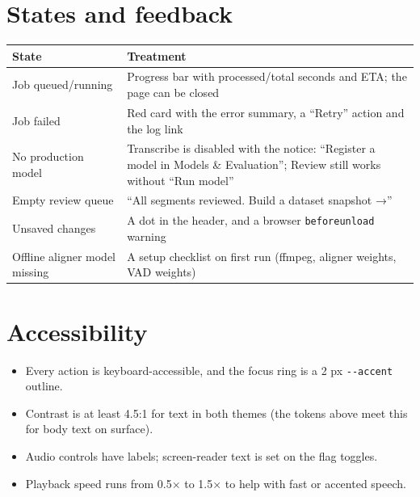 \documentclass[11pt]{article}
\begin{document}
\hypertarget{states-and-feedback}{%
\section{States and feedback}\label{states-and-feedback}}

\begin{longtable}[]{@{}>{\raggedright\arraybackslash}p{}>{\raggedright\arraybackslash}p{}@{}}
\toprule\noalign{}
State & Treatment \\
\midrule\noalign{}
\endhead
\bottomrule\noalign{}
\endlastfoot
Job queued/running & Progress bar with processed/total seconds and ETA; the page can be closed \\
Job failed & Red card with the error summary, a ``Retry'' action and the log link \\
No production model & Transcribe is disabled with the notice: ``Register a model in Models \& Evaluation''; Review still works without ``Run model'' \\
Empty review queue & ``All segments reviewed. Build a dataset snapshot →'' \\
Unsaved changes & A dot in the header, and a browser \texttt{beforeunload} warning \\
Offline aligner model missing & A setup checklist on first run (ffmpeg, aligner weights, VAD weights) \\
\end{longtable}

\hypertarget{accessibility}{%
\section{Accessibility}\label{accessibility}}

\begin{itemize}
\tightlist
\item
  Every action is keyboard-accessible, and the focus ring is a 2 px \texttt{-\allowbreak{}-\allowbreak{}accent} outline.
\item
  Contrast is at least 4.5:1 for text in both themes (the tokens above meet this for body text on surface).
\item
  Audio controls have labels; screen-reader text is set on the flag toggles.
\item
  Playback speed runs from 0.5× to 1.5× to help with fast or accented speech.
\end{itemize}
\end{document}
